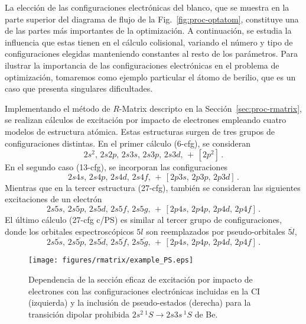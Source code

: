 La elección de las configuraciones electrónicas del blanco, que se 
muestra en la parte superior del diagrama de flujo de la 
Fig.~\ref{fig:proc-optatom}, constituye una de las partes más 
importantes de la optimización. A continuación, se estudia la influencia 
que estas tienen en el cálculo colisional, variando el número y tipo de 
configuraciones elegidas manteniendo constantes al resto de los 
parámetros. Para ilustrar la importancia de las configuraciones 
electrónicas en el problema de optimización, tomaremos como ejemplo 
particular el átomo de berilio, que es un caso que presenta singulares 
dificultades. 

Implementando el método de $R$-Matrix descripto en la 
Sección~\ref{sec:proc-rmatrix}, se realizan cálculos de excitación por 
impacto de electrones empleando cuatro modelos de estructura atómica. 
Estas estructuras surgen de tres grupos de configuraciones distintas. En 
el primer cálculo (6-cfg), se consideran  
\begin{equation}
2s^2,\,2s2p,\,2s3s,\,2s3p,\,2s3d,\,+\,
\left[2p^2\right]\,.
\label{eq:cfgA}
\end{equation} 
En el segundo caso (13-cfg), se incorporan las configuraciones 
\begin{equation}
2s4s,\,2s4p,\,2s4d,\,2s4f,\,+\,
\left[2p3s,\,2p3p,\,2p3d\right]\,.
\label{eq:cfgB}
\end{equation} 
Mientras que en la tercer estructura (27-cfg), también se consideran las 
siguientes excitaciones de un electrón 
\begin{equation}
2s5s,\,2s5p,\,2s5d,\,2s5f,\,2s5g,\,+\,
\left[2p4s,\,2p4p,\,2p4d,\,2p4f\right]\,.
\label{eq:cfgC}
\end{equation} 
El último cálculo (27-cfg c/PS) es similar al tercer grupo de 
configuraciones, donde los orbitales espectroscópicos $5l$ son 
reemplazados por pseudo-orbitales $\overline{5l}$,
\begin{equation}
2s\overline{5s},\,2s\overline{5p},\,2s\overline{5d},\,2s\overline{5f},\,
2s\overline{5g},\,+\,
\left[2p4s,\,2p4p,\,2p4d,\,2p4f\right]\,.
\label{eq:cfgD}
\end{equation} 

\begin{figure}[t]
\centering
\texttt{[image: figures/rmatrix/example\_PS.eps]}
\caption[Dependencia de la sección eficaz de excitación con las 
configuraciones electrónicas y los pseudo-estados.]
{Dependencia de la sección eficaz de excitación por impacto de
electrones con las configuraciones electrónicas incluidas en la CI 
(izquierda) y la inclusión de pseudo-estados (derecha) para la transición 
dipolar prohibida $2s^2\,^1S \rightarrow 2s3s\,^1S$ de Be.}
\label{fig:dependencia-CI}
\end{figure}

